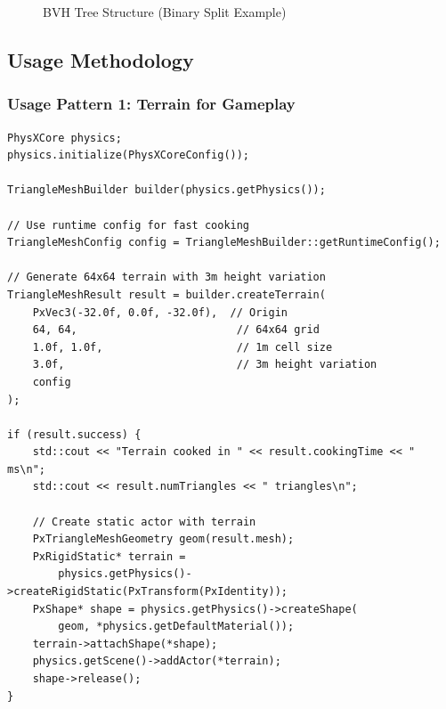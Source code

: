 \begin{figure}[h]
\centering
{}
\caption{BVH Tree Structure (Binary Split Example)}
\end{figure}


\subsection{Usage Methodology}

\subsubsection{Usage Pattern 1: Terrain for Gameplay}

\begin{lstlisting}[caption={Creating runtime terrain}]
PhysXCore physics;
physics.initialize(PhysXCoreConfig());

TriangleMeshBuilder builder(physics.getPhysics());

// Use runtime config for fast cooking
TriangleMeshConfig config = TriangleMeshBuilder::getRuntimeConfig();

// Generate 64x64 terrain with 3m height variation
TriangleMeshResult result = builder.createTerrain(
    PxVec3(-32.0f, 0.0f, -32.0f),  // Origin
    64, 64,                         // 64x64 grid
    1.0f, 1.0f,                     // 1m cell size
    3.0f,                           // 3m height variation
    config
);

if (result.success) {
    std::cout << "Terrain cooked in " << result.cookingTime << " ms\n";
    std::cout << result.numTriangles << " triangles\n";

    // Create static actor with terrain
    PxTriangleMeshGeometry geom(result.mesh);
    PxRigidStatic* terrain =
        physics.getPhysics()->createRigidStatic(PxTransform(PxIdentity));
    PxShape* shape = physics.getPhysics()->createShape(
        geom, *physics.getDefaultMaterial());
    terrain->attachShape(*shape);
    physics.getScene()->addActor(*terrain);
    shape->release();
}
\end{lstlisting}

